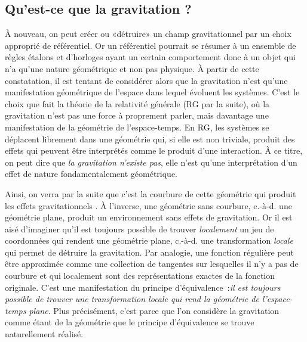\subsection{Qu'est-ce que la gravitation ?}
À nouveau, on peut créer ou «détruire» un champ gravitationnel par un choix approprié de référentiel. Or un référentiel pourrait se résumer à un ensemble de règles étalons et d'horloges ayant un certain comportement donc à un objet qui n'a qu'une nature géométrique et non pas physique. À partir de cette constatation, il est tentant de considérer alors que la gravitation n'est qu'une manifestation géométrique de l'espace dans lequel évoluent les systèmes. C'est le choix que fait la théorie de la relativité générale (RG par la suite), où la gravitation n'est pas une force à proprement parler, mais davantage une manifestation de la géométrie de l'espace-temps. En RG, les systèmes se déplacent librement dans une géométrie qui, si elle est non triviale, produit des effets qui peuvent être interprétés comme le produit d'une interaction. À ce titre, on peut dire que \textit{la gravitation n'existe pas}, elle n'est qu'une interprétation d'un effet de nature fondamentalement géométrique. 

Ainsi, on verra par la suite que c'est la courbure de cette géométrie qui produit les effets gravitationnels . À l'inverse, une géométrie sans courbure, c.-à-d. une géométrie plane, produit un environnement sans effets de gravitation. Or il est aisé d'imaginer qu'il est toujours possible de trouver \textit{localement} un jeu de coordonnées qui rendent une géométrie plane, c.-à-d. une transformation \textit{locale} qui permet de détruire la gravitation. Par analogie, une fonction régulière peut être approximée comme une collection de tangentes sur lesquelles il n'y a pas de courbure et qui localement sont des représentations exactes de la fonction originale. C'est une manifestation du principe d'équivalence~:\textit{il est toujours possible de trouver une transformation locale qui rend la géométrie de l'espace-temps plane}. Plus précisément, c'est parce que l'on considère la gravitation comme étant de la géométrie que le principe d'équivalence se trouve naturellement réalisé.

